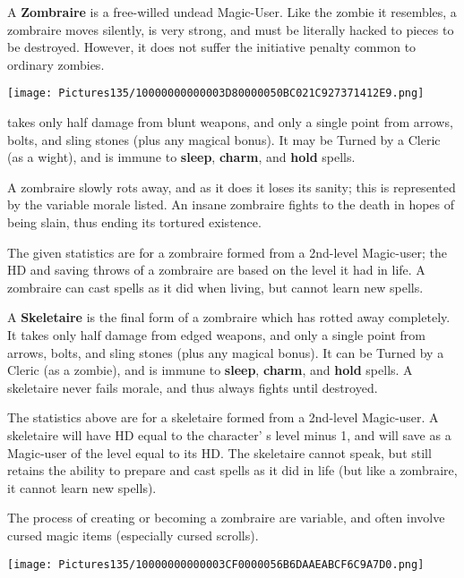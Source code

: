 \documentclass[a4paper,twoside,openany,10pt]{book}
\begin{document}
\begin{multicols}{2}
A \textbf{Zombraire} is a free-willed undead Magic-User. Like the zombie it resembles, a zombraire moves silently, is very strong, and must be literally hacked to pieces to be destroyed. However, it does not suffer the initiative penalty common to ordinary zombies.

\begin{center}
		\texttt{[image: Pictures135/10000000000003D80000050BC021C927371412E9.png]} \end{center}

takes only half damage from blunt weapons, and only a single point from arrows, bolts, and sling stones (plus any magical bonus). It may be Turned by a Cleric (as a wight), and is immune to \textbf{sleep},\textbf{ charm},\textbf{ }and\textbf{ hold} spells.

A zombraire slowly rots away, and as it does it loses its sanity; this is represented by the variable morale listed. An insane zombraire fights to the death in hopes of being slain, thus ending its tortured existence.

The given statistics are for a zombraire formed from a 2nd-level Magic-user; the HD and saving throws of a zombraire are based on the level it had in life. A zombraire can cast spells as it did when living, but cannot learn new spells.

A \textbf{Skeletaire} is the final form of a zombraire which has rotted away completely. It takes only half damage from edged weapons, and only a single point from arrows, bolts, and sling stones (plus any magical bonus). It can be Turned by a Cleric (as a zombie), and is immune to \textbf{sleep},\textbf{ charm}, and \textbf{hold} spells. A skeletaire never fails morale, and thus always fights until destroyed.

The statistics above are for a skeletaire formed from a 2nd-level Magic-user. A skeletaire will have HD equal to the character' s level minus 1, and will save as a Magic-user of the level equal to its HD. The skeletaire cannot speak, but still retains the ability to prepare and cast spells as it did in life (but like a zombraire, it cannot learn new spells). 

The process of creating or becoming a zombraire are variable, and often involve cursed magic items (especially cursed scrolls).

\end{multicols}

 \begin{center}
 \texttt{[image: Pictures135/10000000000003CF0000056B6DAAEABCF6C9A7D0.png]}
 \end{center}
\end{document}
